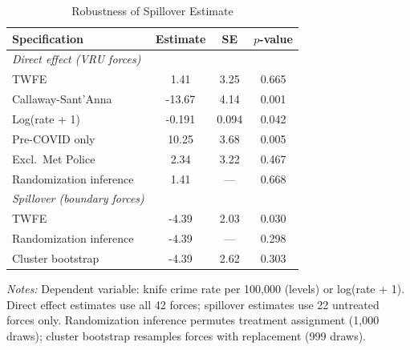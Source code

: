 \begin{table}[htbp]
\centering
\caption{Robustness of Spillover Estimate}
\label{tab:robust}
\begin{threeparttable}
\begin{tabular}{lccc}
\toprule
Specification & Estimate & SE & $p$-value \\
\midrule
\emph{Direct effect (VRU forces)} & & & \\
TWFE & 1.41 & 3.25 & 0.665 \\
Callaway-Sant'Anna & -13.67 & 4.14 & 0.001 \\
Log(rate + 1) & -0.191 & 0.094 & 0.042 \\
Pre-COVID only & 10.25 & 3.68 & 0.005 \\
Excl.\ Met Police & 2.34 & 3.22 & 0.467 \\
Randomization inference & 1.41 & --- & 0.668 \\
[0.5em]
\emph{Spillover (boundary forces)} & & & \\
TWFE & -4.39 & 2.03 & 0.030 \\
Randomization inference & -4.39 & --- & 0.298 \\
Cluster bootstrap & -4.39 & 2.62 & 0.303 \\
\bottomrule
\end{tabular}
\begin{tablenotes}[flushleft]\footnotesize
\item \textit{Notes:} Dependent variable: knife crime rate per 100,000 (levels) or log(rate + 1). Direct effect estimates use all 42 forces; spillover estimates use 22 untreated forces only. Randomization inference permutes treatment assignment (1,000 draws); cluster bootstrap resamples forces with replacement (999 draws).
\end{tablenotes}
\end{threeparttable}
\end{table}


